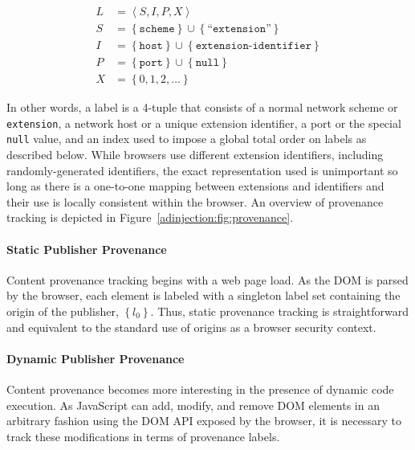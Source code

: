 \begin{align*}
L &= \left\langle S, I, P, X \right\rangle \\
S &= \left\{ \texttt{scheme} \right\} \cup \left\{ \texttt{``extension''} \right\} \\
I &= \left\{ \texttt{host} \right\} \cup \left\{ \texttt{extension-identifier} \right\} \\
P &= \left\{ \texttt{port} \right\} \cup \left\{ \texttt{null} \right\} \\
X &= \left\{0, 1, 2, \ldots\right\}
\end{align*}

In other words, a label is a 4-tuple that consists of a normal network scheme or
\texttt{extension}, a network host or a unique extension identifier, a port or
the special \texttt{null} value, and an index used to impose a global total
order on labels as described below. While browsers use different extension
identifiers, including randomly-generated identifiers, the exact representation
used is unimportant so long as there is a one-to-one mapping between extensions
and identifiers and their use is locally consistent within the browser. An
overview of provenance tracking is depicted in
Figure~\ref{adinjection:fig:provenance}.

\paragraph{Static Publisher Provenance}

Content provenance tracking begins with a web page load. As the DOM is parsed by
the browser, each element is labeled with a singleton label set containing the
origin of the publisher, \(\left\{l_0\right\}\). Thus, static provenance
tracking is straightforward and equivalent to the standard use of origins as a
browser security context.

\paragraph{Dynamic Publisher Provenance}

Content provenance becomes more interesting in the presence of dynamic code
execution. As JavaScript can add, modify, and remove DOM elements in an
arbitrary fashion using the DOM API exposed by the browser, it is necessary to
track these modifications in terms of provenance labels.

